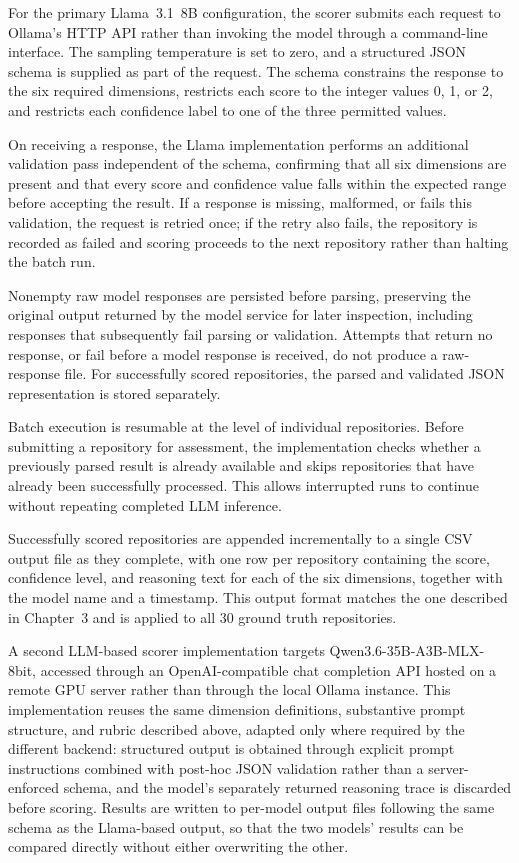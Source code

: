 For the primary Llama~3.1~8B configuration, the scorer submits each
request to Ollama's HTTP API rather than invoking the model through a
command-line interface. The sampling temperature is set to zero, and a
structured JSON schema is supplied as part of the request. The schema
constrains the response to the six required dimensions, restricts each
score to the integer values 0, 1, or 2, and restricts each confidence
label to one of the three permitted values.

On receiving a response, the Llama implementation performs an
additional validation pass independent of the schema, confirming that
all six dimensions are present and that every score and confidence
value falls within the expected range before accepting the result. If
a response is missing, malformed, or fails this validation, the request
is retried once; if the retry also fails, the repository is recorded
as failed and scoring proceeds to the next repository rather than
halting the batch run.

Nonempty raw model responses are persisted before parsing, preserving
the original output returned by the model service for later inspection,
including responses that subsequently fail parsing or validation.
Attempts that return no response, or fail before a model response is
received, do not produce a raw-response file. For successfully scored
repositories, the parsed and validated JSON representation is stored
separately.

Batch execution is resumable at the level of individual repositories.
Before submitting a repository for assessment, the implementation
checks whether a previously parsed result is already available and
skips repositories that have already been successfully processed.
This allows interrupted runs to continue without repeating completed
LLM inference.

Successfully scored repositories are appended incrementally to a
single CSV output file as they complete, with one row per repository
containing the score, confidence level, and reasoning text for each
of the six dimensions, together with the model name and a timestamp.
This output format matches the one described in Chapter~3 and is
applied to all 30 ground truth repositories.

A second LLM-based scorer implementation targets Qwen3.6-35B-A3B-MLX-8bit, 
accessed through an OpenAI-compatible chat completion API hosted on a remote 
GPU server rather than through the local Ollama instance. This implementation 
reuses the same dimension definitions, substantive prompt structure, and rubric described above, 
adapted only where required by the different backend: structured output is obtained 
through explicit prompt instructions combined with post-hoc JSON validation rather than 
a server-enforced schema, and the model's separately returned reasoning trace is discarded 
before scoring. Results are written to per-model output files following the same schema as the 
Llama-based output, so that the two models' results can be compared directly without either overwriting 
the other.
